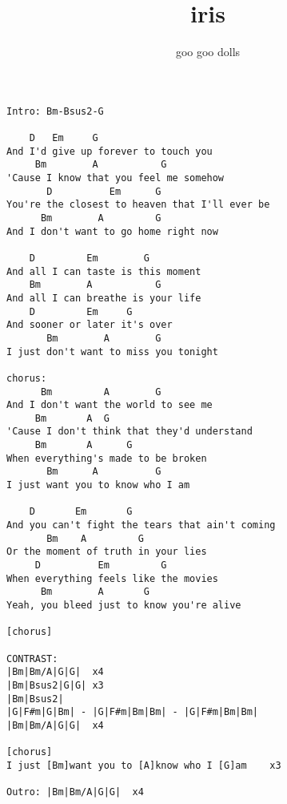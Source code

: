 \author{goo goo dolls}
\title{iris}
\maketitle
\begin{verbatim}   
Intro: Bm-Bsus2-G

	D	Em	   G
And I'd give up forever to touch you
	 Bm	       A           G
'Cause I know that you feel me somehow
	   D	      Em	  G
You're the closest to heaven that I'll ever be
      Bm	    A		  G
And I don't want to go home right now

    D	      Em	    G
And all I can taste is this moment
    Bm	      A		      G
And all I can breathe is your life
    D	      Em	 G
And sooner or later it's over
       Bm	     A	      G
I just don't want to miss you tonight

chorus:
      Bm	     A	      G
And I don't want the world to see me
	 Bm		  A	 G
'Cause I don't think that they'd understand
     Bm		  A	     G
When everything's made to be broken
       Bm	   A	      G
I just want you to know who I am

	D		Em		 G
And you can't fight the tears that ain't coming
       Bm	 A	       G
Or the moment of truth in your lies
     D	        Em	       G
When everything feels like the movies
	  Bm		A	    G
Yeah, you bleed just to know you're alive

[chorus]

CONTRAST: 
|Bm|Bm/A|G|G|  x4
|Bm|Bsus2|G|G| x3
|Bm|Bsus2|
|G|F#m|G|Bm| - |G|F#m|Bm|Bm| - |G|F#m|Bm|Bm|
|Bm|Bm/A|G|G|  x4

[chorus]
I just [Bm]want you to [A]know who I [G]am    x3

Outro: |Bm|Bm/A|G|G|  x4
\end{verbatim}